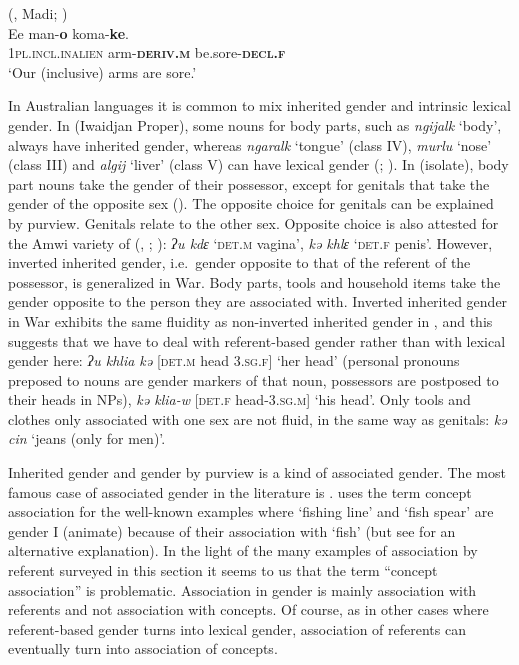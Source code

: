 \documentclass[output=collectionpaper]{langsci/langscibook}
\begin{document}
\ea\label{ex:WDG:10}
 (, Madi; \citealt[490]{Dixon2000})\\
\gll Ee 	man-\textbf{o} 	koma-\textbf{ke}.\\
1\textsc{pl.incl.inalien} 	arm-\textbf{\textsc{deriv.m}} 	be.sore-\textbf{\textsc{decl.f}}\\
\glt `Our (inclusive) arms are sore.'\\
\z

In Australian languages it is common to mix inherited gender and intrinsic lexical gender. In  (Iwaidjan Proper), some nouns for body parts, such as  \textit{ngijalk} `body', always have inherited gender, whereas \textit{ngaralk} `tongue' (class IV), \textit{murlu} `nose' (class III) and \textit{algij} `liver' (class V) can have lexical gender (\citealt{Capell1970}; \citealt[5]{Evans1994}). In  (isolate), body part nouns take the gender of their possessor, except for genitals that take the gender of the opposite sex (\citealt[2]{Evans1994}). The opposite choice for genitals can be explained by purview. Genitals relate to the other sex. Opposite choice is also attested for the Amwi variety of  (, ; \citealt{Weidert1975}): \textit{ʔu kdɛ} `\textsc{det.m} vagina', \textit{kə khlɛ} `\textsc{det.f} penis'. However, inverted inherited gender, i.e.\ gender opposite to that of the referent of the possessor, is generalized in  War. Body parts, tools and household items take the gender opposite to the person they are associated with. Inverted inherited gender in  War exhibits the same fluidity as non-inverted inherited gender in , and this suggests that we have to deal with referent-based gender rather than with lexical gender here: \textit{ʔu khlia kə} [\textsc{det.m} head 3.\textsc{sg.f}] `her head' (personal pronouns preposed to nouns are gender markers of that noun, possessors are postposed to their heads in NPs), \textit{kə klia-w} [\textsc{det.f} head-3.\textsc{sg.m}] `his head'. Only tools and clothes only associated with one sex are not fluid, in the same way as genitals: \textit{kə cin} `jeans (only for men)'.

Inherited gender and gender by purview is a kind of associated gender. The most famous case of associated gender in the literature is . \cite[16]{Corbett1991} uses the term concept association for the well-known  examples where `fishing line' and `fish spear' are gender I (animate) because of their association with `fish' (but see \citealt{Plaster2007} for an alternative explanation). In the light of the many examples of association by referent surveyed in this section it seems to us that the term ``concept association'' is problematic. Association in gender is mainly association with referents and not association with concepts. Of course, as in other cases where referent-based gender turns into lexical gender, association of referents can eventually turn into association of concepts.
\end{document}
